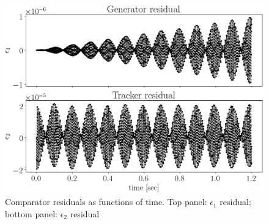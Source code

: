 \begin{figure}[h]
  \centering
  \includegraphics[height=.35\paperheight]{images/smp_sim/residual_vs_time(both)}
  \caption{Comparator residuals as functions of time.
    Top panel: $\epsilon_1$ residual; bottom panel: $\epsilon_2$ residual\label{fig:residuals}}
\end{figure}

